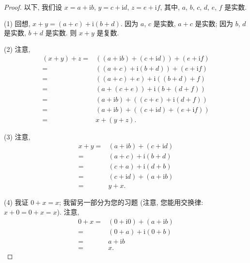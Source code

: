 \documentclass[../libro.tex]{subfiles}
\begin{document}
\begin{proof}
    以下, 我们设
    \(x = a + \mathrm{i} b\),
    \(y = c + \mathrm{i} d\),
    \(z = e + \mathrm{i} f\),
    其中,
    \(a\), \(b\), \(c\), \(d\), \(e\), \(f\) 是实数.

    (1)
    回想,
    \(x + y = (a + c) + \mathrm{i} (b + d)\).
    因为 \(a\), \(c\) 是实数,
    \(a + c\) 是实数;
    因为 \(b\), \(d\) 是实数,
    \(b + d\) 是实数.
    则 \(x + y\) 是复数.

    (2)
    注意,
    \begin{align*}
        (x + y) + z
        = {} &
        ((a + \mathrm{i} b) + (c + \mathrm{i} d))
        + (e + \mathrm{i} f)
        \\
        = {} &
        ((a + c) + \mathrm{i} (b + d))
        + (e + \mathrm{i} f)
        \\
        = {} &
        ((a + c) + e) + \mathrm{i} ((b + d) + f)
        \\
        = {} &
        (a + (c + e)) + \mathrm{i} (b + (d + f))
        \\
        = {} &
        (a + \mathrm{i} b)
        + ((c + e) + \mathrm{i} (d + f))
        \\
        = {} &
        (a + \mathrm{i} b)
        + ((c + \mathrm{i} d) + (e + \mathrm{i} f))
        \\
        = {} &
        x + (y + z).
    \end{align*}

    (3)
    注意,
    \begin{align*}
        x + y
        = {} &
        (a + \mathrm{i} b) + (c + \mathrm{i} d)
        \\
        = {} &
        (a + c) + \mathrm{i} (b + d)
        \\
        = {} &
        (c + a) + \mathrm{i} (d + b)
        \\
        = {} &
        (c + \mathrm{i} d) + (a + \mathrm{i} b)
        \\
        = {} &
        y + x.
    \end{align*}

    (4)
    我证 \(0 + x = x\);
    我留另一部分为您的习题
    (注意, 您能用交换律:
    \(x + 0 = 0 + x = x\)).
    注意,
    \begin{align*}
        0 + x
        = {} &
        (0 + \mathrm{i} 0) + (a + \mathrm{i} b)
        \\
        = {} &
        (0 + a) + \mathrm{i} (0 + b)
        \\
        = {} &
        a + \mathrm{i} b
        \\
        = {} &
        x.
    \end{align*}


\end{proof}
\end{document}
